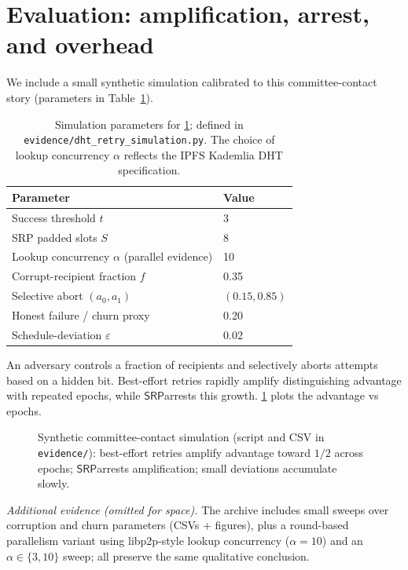 \documentclass[11pt]{article}
\newcommand{\SRP}{\ensuremath{\mathsf{SRP}}}
\begin{document}
\section{Evaluation: amplification, arrest, and overhead}
We include a small synthetic simulation calibrated to this committee-contact story (parameters in Table~\ref{tab:simparams}).

\begin{table}[t]
\centering
\begin{tabular}{@{}ll@{}}
\toprule
Parameter & Value \\
\midrule
Success threshold $t$ & 3 \\
SRP padded slots $S$ & 8 \\
Lookup concurrency $\alpha$ (parallel evidence) & 10 \\
Corrupt-recipient fraction $f$ & 0.35 \\
Selective abort $(a_0,a_1)$ & $(0.15, 0.85)$ \\
Honest failure / churn proxy & 0.20 \\
Schedule-deviation $\varepsilon$ & 0.02 \\
\bottomrule
\end{tabular}
\caption{Simulation parameters for \cref{fig:dhtsim}; defined in \texttt{evidence/dht\_retry\_simulation.py}. The choice of lookup concurrency $\alpha$ reflects the IPFS Kademlia DHT specification.\cite{ipfsKadDHTSpec2025}}
\label{tab:simparams}
\end{table}


An adversary controls a fraction of recipients and selectively aborts attempts based on a hidden bit.
Best-effort retries rapidly amplify distinguishing advantage with repeated epochs, while \SRP arrests this growth.
\cref{fig:dhtsim} plots the advantage vs epochs.

\begin{figure}[t]
  \centering
  \caption{Synthetic committee-contact simulation (script and CSV in \texttt{evidence/}): best-effort retries amplify advantage toward $1/2$ across epochs; \SRP arrests amplification; small deviations accumulate slowly.}
  \label{fig:dhtsim}
\end{figure}

\noindent\emph{Additional evidence (omitted for space).} The archive includes small sweeps over corruption and churn parameters (CSVs + figures), plus a round-based parallelism variant using libp2p-style lookup concurrency ($\alpha=10$) and an $\alpha\in\{3,10\}$ sweep; all preserve the same qualitative conclusion.
\end{document}

